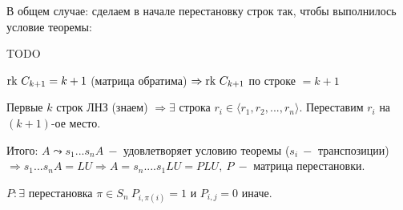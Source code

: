 В общем случае: сделаем в начале перестановку строк так, чтобы выполнилось условие теоремы:

TODO

$\text{rk } C_{k+1}=k+1$ (матрица обратима) $\Rightarrow \text{rk } C_{k+1}$ по строке $=k+1$

Первые $k$ строк ЛНЗ (знаем) $\Rightarrow \exists$ строка $r_i\in \langle r_1, r_2,...,r_n\rangle$. Переставим $r_i$ на $(k+1)$-ое место.

Итого: $A\leadsto s_1...s_nA\ -$ удовлетворяет условию теоремы ($s_i\ -$ транспозиции) $\Rightarrow s_1...s_nA=LU\Rightarrow A = s_n....s_1LU=PLU,\  P\ -$ матрица перестановки.

$P:\exists $ перестановка $ \pi \in S_n\ P_{i,\pi(i)}=1 $ и $ P_{i,j}=0$ иначе.